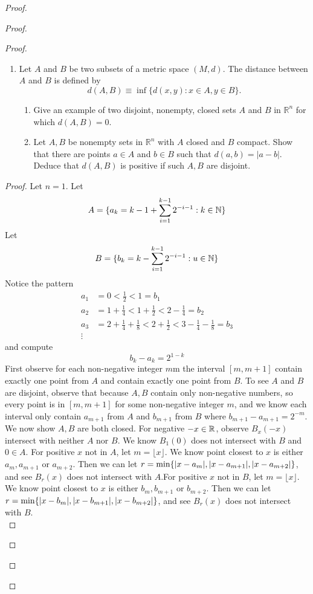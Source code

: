 \documentclass{report}
\begin{document}
\begin{proof}
\begin{proof}
\begin{proof}
\begin{question}{}{}
\begin{enumerate}
    \item Let \( A \) and \( B \) be two subsets of a metric space \( (M,d) \). The distance between \( A \) and \( B \) is defined by
    \[
    d(A,B) \equiv \inf\{d(x,y) : x \in A, y \in B\}.
    \]
    \begin{enumerate}
        \item Give an example of two disjoint, nonempty, closed sets \( A \) and \( B \) in \( \mathbb{R}^n \) for which \( d(A, B) = 0 \).
        \item Let \( A, B \) be nonempty sets in \( \mathbb{R}^n \) with \( A \) closed and \( B \) compact. Show that there are points \( a \in A \) and \( b \in B \) such that \( d(a, b) = |a-b| \). Deduce that \( d(A, B) \) is positive if such \( A, B \) are disjoint.
    \end{enumerate}
\end{enumerate}
\end{question}
\begin{proof}
Let $n=1$. Let 
\begin{equation}
A=\{ a_k=k-1+\sum_{i=1}^{k-1}2^{-i-1}:k\in\mathbb{N} \}
\end{equation}
Let
\begin{equation}
B=\{ b_k=k-\sum_{i=1}^{k-1}2^{-i-1}:u\in\mathbb{N} \}
\end{equation}
Notice the pattern
\begin{align}
  a_1&=0<\frac{1}{2}< 1=b_1\\
  a_2&=1+\frac{1}{4}< 1+\frac{1}{2}< 2-\frac{1}{4}=b_2\\
  a_3&=2+\frac{1}{4}+\frac{1}{8}< 2+\frac{1}{2}< 3-\frac{1}{4}-\frac{1}{8}=b_3\\
  \vdots
\end{align}
and compute
\begin{equation}
b_k-a_k=2^{1-k}
\end{equation}
First observe for each non-negative integer $m$m the interval  $[m,m+1]$ contain exactly one point from $A$ and contain exactly one point from  $B$. To see  $A$ and  $B$ are disjoint, observe that because  $A,B$ contain only non-negative numbers, so every point is in $[m,m+1]$ for some non-negative integer $m$, and we know each interval only contain $a_{m+1}$ from $A$ and $b_{m+1}$ from $B$ where  $b_{m+1}-a_{m+1}=2^{-m}$.\\

We now show $A,B$ are both closed. For negative  $-x\in\mathbb{R}$, observe $B_{x}(-x)$ intersect with neither $A$ nor  $B$. We know $B_1(0)$ does not intersect with $B$ and  $0\in A$. For positive $x$ not in $A$, let $m=\lfloor x \rfloor$. We know point closest to $x$ is either $a_{m},a_{m+1}\text{ or }a_{m+2}$. Then we can let $r=\min \{ |x-a_m|,|x-a_{m+1}|,|x-a_{m+2}| \}$, and see $B_r(x)$ does not intersect with $A$.For positive $x$ not in $B$, let $m=\lfloor x \rfloor$. We know point closest to $x$ is either $b_{m},b_{m+1}\text{ or }b_{m+2}$. Then we can let $r=\min \{ |x-b_m|,|x-b_{m+1}|,|x-b_{m+2}| \}$, and see $B_r(x)$ does not intersect with $B$.\\


\end{proof}
\end{proof}
\end{proof}
\end{proof}
\end{document}
